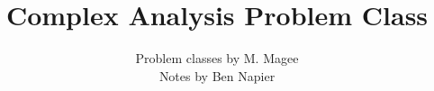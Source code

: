 \documentclass[a4paper, answers]{exam}
\title{Complex Analysis Problem Class}
\author{Problem classes by M. Magee \\ Notes by Ben Napier}
\begin{document}
    \maketitle
    \begin{questions}
        
    \end{questions}
\end{document}
